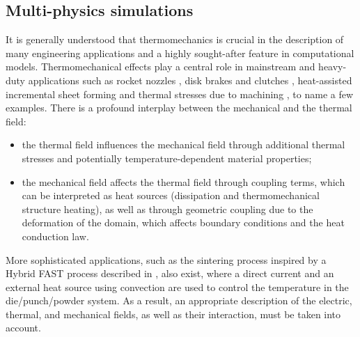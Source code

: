  \subsection[Multi-physics simulations]{Multi-physics simulations }\label{sec:multi_physics_sims}

It is generally understood that thermomechanics is crucial in the description of many  engineering applications and a highly sought-after feature in computational models.
Thermomechanical effects play a central role in mainstream and heavy-duty applications such as rocket nozzles \citep{kuhl2002ThermomechanicalAnalysisOptimization,danowski_monolithic_2013}, disk brakes and clutches \citep{yevtushenko2015NumericalAnalysisThermal}, heat-assisted incremental sheet forming \citep{liu2018HeatassistedIncrementalSheet} and thermal stresses due to machining \citep{elsheikh2021ComprehensiveReviewResidual}, to name a few examples.
There is a profound interplay between the mechanical and the thermal field:
\begin{itemize}
  \item the thermal field influences the mechanical field through additional thermal stresses and potentially temperature-dependent material properties;
  \item  the mechanical field affects the thermal field through coupling terms, which can be interpreted as heat sources (dissipation and thermomechanical structure heating), as well as through geometric coupling due to the deformation of the domain, which affects boundary conditions and the heat conduction law.
\end{itemize}

More sophisticated applications, such as the sintering process inspired by a Hybrid FAST process described in \cite{rotheAnalyticalNumericalTreatment2014}, also exist, where a direct current and an external heat source using convection are used to control the temperature in the die/punch/powder system.
As a result, an appropriate description of the electric, thermal, and mechanical fields, as well as their interaction, must be taken into account.

